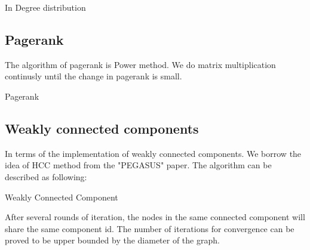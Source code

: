 \begin{algorithm}
\caption{In Degree distribution}
\begin{algorithmic}
\end{algorithmic}
\end{algorithm}

\subsection{Pagerank}
The algorithm of pagerank is Power method. We do matrix multiplication continusly until the change in pagerank is small. 
\begin{algorithm}
\caption{Pagerank}
\begin{algorithmic}
\REPEAT
{}
\end{algorithmic}
\end{algorithm}

\subsection{Weakly connected components}
In terms of the implementation of weakly connected components. We borrow the idea of HCC method from the "PEGASUS" paper.\cite{Kang09}
The algorithm can be described as following:
\begin{algorithm}
\caption{Weakly Connected Component}
\begin{algorithmic}
\REPEAT
{}
\end{algorithmic}
\end{algorithm}
After several rounds of iteration, the nodes in the same connected component will share the same component id.
The number of iterations for convergence can be proved to be upper bounded by the diameter of the graph.

